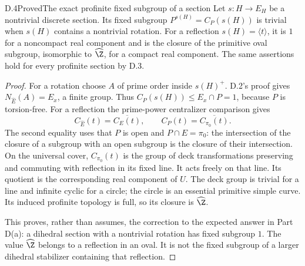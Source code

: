 \begin{claim}{D.4}{Proved}{The exact profinite fixed subgroup of a section}
Let $s:H\to E_H$ be a nontrivial discrete section. Its fixed subgroup $P^{s(H)}=C_P(s(H))$ is trivial when $s(H)$ contains a nontrivial rotation. For a reflection $s(H)=\langle t\rangle$, it is $1$ for a noncompact real component and is the closure of the primitive oval subgroup, isomorphic to $\widehat\Z$, for a compact real component. The same assertions hold for every profinite section by D.3.
\end{claim}
\begin{proof}
For a rotation choose $A$ of prime order inside $s(H)^+$. D.2's proof gives $N_{\widehat E}(A)=E_x$, a finite group. Thus $C_P(s(H))\leq E_x\cap P=1$, because $P$ is torsion-free. For a reflection the prime-power centralizer comparison gives
\[
C_{\widehat E}(t)=\overline{C_E(t)},\qquad
C_P(t)=\overline{C_{\pi_0}(t)}.
\]
The second equality uses that $P$ is open and $P\cap E=\pi_0$: the intersection of the closure of a subgroup with an open subgroup is the closure of their intersection. On the universal cover, $C_{\pi_0}(t)$ is the group of deck transformations preserving and commuting with reflection in its fixed line. It acts freely on that line. Its quotient is the corresponding real component of $U$. The deck group is trivial for a line and infinite cyclic for a circle; the circle is an essential primitive simple curve. Its induced profinite topology is full, so its closure is $\widehat\Z$.

This proves, rather than assumes, the correction to the expected answer in Part D(a): a dihedral section with a nontrivial rotation has fixed subgroup $1$. The value $\widehat\Z$ belongs to a reflection in an oval. It is not the fixed subgroup of a larger dihedral stabilizer containing that reflection.
\end{proof}

